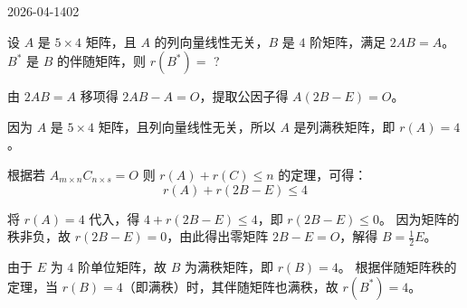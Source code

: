 \begin{mistake}{2026-04-14}{02}

\begin{problemcontent}
设 \(A\) 是 \(5 \times 4\) 矩阵，且 \(A\) 的列向量线性无关，\(B\) 是 \(4\) 阶矩阵，满足 \(2AB = A\)。\(B^*\) 是 \(B\) 的伴随矩阵，则 \(r(B^*) =\) ?
\end{problemcontent}

\begin{solutioncontent}
由 \(2AB = A\) 移项得 \(2AB - A = O\)，提取公因子得 \(A(2B - E) = O\)。

因为 \(A\) 是 \(5 \times 4\) 矩阵，且列向量线性无关，所以 \(A\) 是列满秩矩阵，即 \(r(A) = 4\)。

根据若 \(A_{m \times n}C_{n \times s} = O\) 则 \(r(A) + r(C) \le n\) 的定理，可得：
\[ r(A) + r(2B - E) \le 4 \]

将 \(r(A) = 4\) 代入，得 \(4 + r(2B - E) \le 4\)，即 \(r(2B - E) \le 0\)。
因为矩阵的秩非负，故 \(r(2B - E) = 0\)，由此得出零矩阵 \(2B - E = O\)，解得 \(B = \frac{1}{2}E\)。

由于 \(E\) 为 \(4\) 阶单位矩阵，故 \(B\) 为满秩矩阵，即 \(r(B) = 4\)。
根据伴随矩阵秩的定理，当 \(r(B) = 4\)（即满秩）时，其伴随矩阵也满秩，故 \(r(B^*) = 4\)。
\end{solutioncontent}


\end{mistake}
